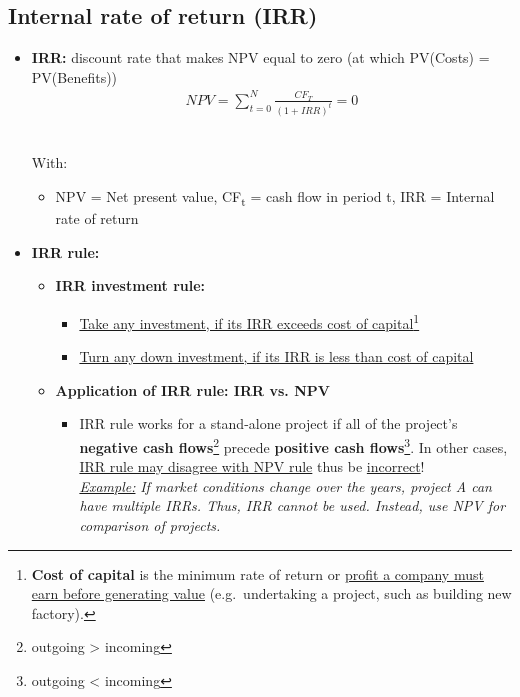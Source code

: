 \documentclass[ieeetran]{article}
\begin{document}
\subsection{Internal rate of return (IRR)} %
\label{ssub:internal_rate_of_return_iRR_}
\begin{itemize}
  \item \textbf{IRR:} discount rate that makes NPV equal to zero (at which PV(Costs) = PV(Benefits))
	  \large
	  \begin{equation*}
	  \boxed{
	  \begin{aligned}
	  NPV = \sum_{t=0}^{N} \frac{CF_T}{(1+IRR)^t} = 0  
	  \end{aligned}
	  }
	  \end{equation*}
	  \\
	  \normalsize

	  With:
	  \begin{itemize}
	    \item NPV = Net present value, CF\textsubscript{t} = cash flow in period t,
		    IRR = Internal rate of return
	  \end{itemize}

\item \textbf{IRR rule:}
	\begin{itemize}
	  \item \textbf{IRR investment rule:}
		  \begin{itemize}
			  \item \underline{Take any investment, if its IRR exceeds cost of capital}\footnote{\textbf{Cost of capital} is the minimum rate of return or \underline{profit a company must earn before generating value} (e.g.\ undertaking a project, such as building new factory).}
			\item \underline{Turn any down investment, if its IRR is less than cost of capital}
		  \end{itemize}
	  \item \textbf{Application of IRR rule: IRR vs. NPV}
		  \begin{itemize}
			  \item IRR rule works for a stand-alone project if all of the project's \textbf{negative cash flows}\footnote{outgoing > incoming} precede \textbf{positive cash flows}\footnote{outgoing < incoming}. In other cases, \underline{IRR rule may disagree with NPV rule} thus be \underline{incorrect}!\\ 

			 \underline{\textit{Example:}}  \textit{If market conditions change over the years, project A can have multiple IRRs. Thus, IRR cannot be used. Instead, use NPV for comparison of projects.}
	

\end{itemize}
\end{itemize}
\end{itemize}
\end{document}
